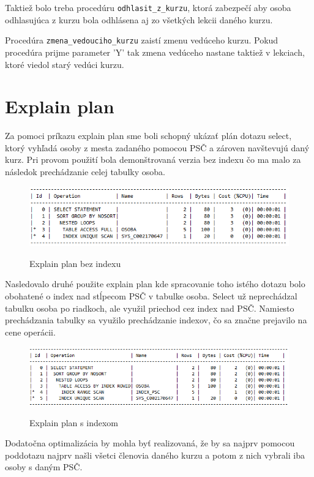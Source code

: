 \documentclass[11pt]{article}
\begin{document}
Taktiež bolo treba procedúru \texttt{odhlasit\_z\_kurzu}, ktorá zabezpečí 
aby osoba odhlasujúca z kurzu bola odhlásena aj zo všetkých lekcii daného kurzu. 

Procedúra \texttt{zmena\_vedouciho\_kurzu} zaistí zmenu vedúceho kurzu. Pokud procedúra prijme parameter 'Y'
tak zmena vedúceho nastane taktiež v lekciach, ktoré viedol starý vedúci kurzu.

\section{Explain plan}
Za pomoci príkazu explain plan sme boli schopný ukázať plán dotazu select, ktorý vyhľadá osoby z mesta zadaného pomocou PSČ
a zároven navštevujú daný kurz. Pri provom použití bola demonštrovaná verzia bez indexu čo ma malo za následok prechádzanie
celej tabulky osoba. 

\begin{figure}[ht]
    \centering
    \caption{Explain plan bez indexu}    
    \includegraphics[scale=.6]{bez_indexu.png}    
    \label{lopata}
\end{figure}

Nasledovalo druhé použite explain plan kde spracovanie toho istého dotazu bolo obohatené o index nad
stĺpecom PSČ v tabulke osoba. Select už neprechádzal tabulku osoba po riadkoch, ale využil priechod cez index nad PSČ.
Namiesto prechádzania tabulky sa využilo prechádzanie indexov, čo sa značne prejavilo na cene operácii.

\begin{figure}[ht]
    \centering
    \caption{Explain plan s indexom}    
    \includegraphics[scale=.6]{s_indexom.png}    
    \label{lopata}
\end{figure}


Dodatočna optimalizácia 
by mohla byť realizovaná, že by sa najprv pomocou poddotazu najprv našli všetci členovia daného kurzu a potom z nich vybrali 
iba osoby s daným PSČ.
\end{document}
